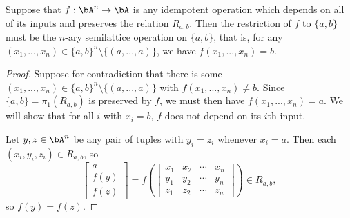 \begin{prop} Suppose that $f : \bA^n \rightarrow \bA$ is any idempotent operation which depends on all of its inputs and preserves the relation $R_{a,b}$. Then the restriction of $f$ to $\{a,b\}$ must be the $n$-ary semilattice operation on $\{a,b\}$, that is, for any $(x_1, ..., x_n) \in \{a,b\}^n \setminus \{(a,...,a)\}$, we have $f(x_1, ..., x_n) = b$.
\end{prop}
\begin{proof} Suppose for contradiction that there is some $(x_1, ..., x_n) \in \{a,b\}^n \setminus \{(a,...,a)\}$ with $f(x_1, ..., x_n) \ne b$. Since $\{a,b\} = \pi_1(R_{a,b})$ is preserved by $f$, we must then have $f(x_1, ..., x_n) = a$. We will show that for all $i$ with $x_i = b$, $f$ does not depend on its $i$th input.

Let $y, z \in \bA^n$ be any pair of tuples with $y_i = z_i$ whenever $x_i = a$. Then each $(x_i,y_i,z_i) \in R_{a,b}$, so
\[
\begin{bmatrix} a\\ f(y)\\ f(z)\end{bmatrix} = f\left(\begin{bmatrix} x_1 & x_2 & \cdots & x_n\\ y_1 & y_2 & \cdots & y_n\\ z_1 & z_2 & \cdots & z_n\end{bmatrix}\right) \in R_{a,b},
\]
so $f(y) = f(z)$.
\end{proof}

